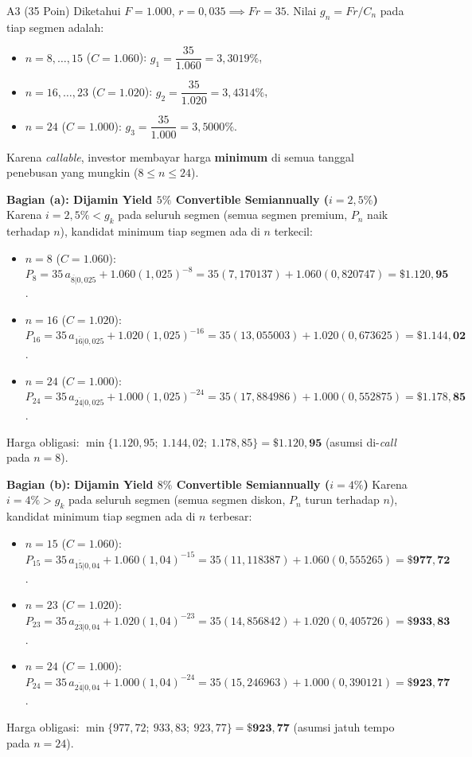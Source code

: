 \documentclass[11pt,a4paper]{article}
\newcommand{\angl}[1]{\overline{#1|}}
\begin{document}
\begin{solusibox}{A3 (35 Poin)}
Diketahui $F = 1.000$, $r = 0{,}035 \implies Fr = 35$. Nilai $g_n = Fr / C_n$ pada tiap segmen adalah:
\begin{itemize}[leftmargin=5mm, topsep=1pt, itemsep=1pt]
    \item $n = 8, \dots, 15$ ($C = 1.060$): $g_1 = \dfrac{35}{1.060} = 3{,}3019\%$,
    \item $n = 16, \dots, 23$ ($C = 1.020$): $g_2 = \dfrac{35}{1.020} = 3{,}4314\%$,
    \item $n = 24$ ($C = 1.000$): $g_3 = \dfrac{35}{1.000} = 3{,}5000\%$.
\end{itemize}
Karena \textit{callable}, investor membayar harga \textbf{minimum} di semua tanggal penebusan yang mungkin ($8 \le n \le 24$).

\textbf{Bagian (a): Dijamin Yield $5\%$ Convertible Semiannually ($i = 2{,}5\%$)}
Karena $i = 2{,}5\% < g_k$ pada seluruh segmen (semua segmen premium, $P_n$ naik terhadap $n$), kandidat minimum tiap segmen ada di $n$ terkecil:
\begin{itemize}[leftmargin=5mm, topsep=1pt, itemsep=1pt]
    \item $n = 8$ ($C = 1.060$): $P_8 = 35\,a_{\angl{8}0{,}025} + 1.060(1{,}025)^{-8} = 35(7{,}170137) + 1.060(0{,}820747) = \mathbf{\$1.120{,}95}$.
    \item $n = 16$ ($C = 1.020$): $P_{16} = 35\,a_{\angl{16}0{,}025} + 1.020(1{,}025)^{-16} = 35(13{,}055003) + 1.020(0{,}673625) = \mathbf{\$1.144{,}02}$.
    \item $n = 24$ ($C = 1.000$): $P_{24} = 35\,a_{\angl{24}0{,}025} + 1.000(1{,}025)^{-24} = 35(17{,}884986) + 1.000(0{,}552875) = \mathbf{\$1.178{,}85}$.
\end{itemize}
Harga obligasi: $\min\{1.120{,}95;\ 1.144{,}02;\ 1.178{,}85\} = \mathbf{\$1.120{,}95}$ (asumsi di-\textit{call} pada $n = 8$).

\textbf{Bagian (b): Dijamin Yield $8\%$ Convertible Semiannually ($i = 4\%$)}
Karena $i = 4\% > g_k$ pada seluruh segmen (semua segmen diskon, $P_n$ turun terhadap $n$), kandidat minimum tiap segmen ada di $n$ terbesar:
\begin{itemize}[leftmargin=5mm, topsep=1pt, itemsep=1pt]
    \item $n = 15$ ($C = 1.060$): $P_{15} = 35\,a_{\angl{15}0{,}04} + 1.060(1{,}04)^{-15} = 35(11{,}118387) + 1.060(0{,}555265) = \mathbf{\$977{,}72}$.
    \item $n = 23$ ($C = 1.020$): $P_{23} = 35\,a_{\angl{23}0{,}04} + 1.020(1{,}04)^{-23} = 35(14{,}856842) + 1.020(0{,}405726) = \mathbf{\$933{,}83}$.
    \item $n = 24$ ($C = 1.000$): $P_{24} = 35\,a_{\angl{24}0{,}04} + 1.000(1{,}04)^{-24} = 35(15{,}246963) + 1.000(0{,}390121) = \mathbf{\$923{,}77}$.
\end{itemize}
Harga obligasi: $\min\{977{,}72;\ 933{,}83;\ 923{,}77\} = \mathbf{\$923{,}77}$ (asumsi jatuh tempo pada $n = 24$).
\end{solusibox}
\end{document}
